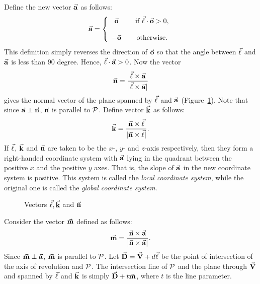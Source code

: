      Define the new vector $\vec{\bf a}$ as follows:
\begin{equation}
\label{eqn:vector-a}
      \vec{\bf a} = \left\{ \begin{array}{ccc}
                    \vec{\bf o} & & \mbox{if $\vec{\bf \ell}\cdot\vec{\bf o}>0$},\\
                              & & \\
                   -\vec{\bf o} & & \mbox{otherwise}.
                    \end{array} \right.
\end{equation}
This definition simply reverses the direction of $\vec{\bf o}$ so that the angle
between $\vec{\bf \ell}$ and $\vec{\bf a}$ is less than 90 degree.  
Hence, $\vec{\bf \ell}\cdot\vec{\bf a}>0$.  Now the vector 
\begin{equation}
\label{eqn:vector-n}
\vec{\bf n}=\frac{\vec{\bf \ell}\times\vec{\bf a}}{|\vec{\bf \ell}\times\vec{\bf a}|}
\end{equation}
gives the normal vector of the plane spanned by $\vec{\bf \ell}$ and 
$\vec{\bf a}$ (Figure~\ref{fig:vectors-a-n-k}).  
Note that since $\vec{\bf a}\perp\vec{\bf n}$, $\vec{\bf n}$ is
parallel to ${\cal P}$.  Define vector $\vec{\bf k}$ as follows:
\begin{equation}
\label{eqn:vector-k}
\vec{\bf k}=\frac{\vec{\bf n}\times\vec{\bf \ell}}{|\vec{\bf n}\times\vec{\bf \ell}|}.
\end{equation}
If $\vec{\bf \ell}$, $\vec{\bf k}$ and $\vec{\bf n}$ are taken to be the $x$-, $y$- 
and $z$-axis respectively, then they form a right-handed coordinate system 
with $\vec{\bf a}$ lying in the quadrant between the positive $x$ and the 
positive $y$ axes.  That is, the slope of $\vec{\bf a}$ in the new coordinate 
system is positive.  This system is called the {\em local coordinate system}, 
while the original one is called the {\em global coordinate system}.
\begin{figure}
\vspace{5.5cm}
\caption{Vectors $\vec{\bf \ell}, \vec{\bf k}$ and $\vec{\bf n}$}
\label{fig:vectors-a-n-k}
\end{figure}

     Consider the vector $\vec{\bf m}$ defined as follows:
\begin{equation}
\label{eqn:vector-m}
\vec{\bf m}=\frac{\vec{\bf n}\times\vec{\bf a}}{|\vec{\bf n}\times\vec{\bf a}|}.
\end{equation}
Since $\vec{\bf m}\perp\vec{\bf a}$, $\vec{\bf m}$ is parallel to ${\cal P}$.
Let $\vec{\bf D}=\vec{\bf V}+d\vec{\bf \ell}$ be the point of 
intersection of the axis of revolution and
${\cal P}$.  The intersection line of ${\cal P}$ and the plane through
$\vec{\bf V}$ and spanned by $\vec{\bf \ell}$ and $\vec{\bf k}$ is simply
$\vec{\bf D}+t\vec{\bf m}$, where $t$ is the line parameter.

